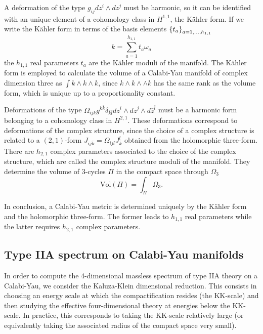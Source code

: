  A deformation of the type $g_{ij}dz^i \wedge dz^j$ must be harmonic, so it can be identified with an unique element of a cohomology class in $H^{1,1}$, the Kähler form.
 If we write the Kähler form in terms of the basis elements $\qty{t_a}_{a=1,\ldots,h_{1,1}}$
\begin{equation}
k=\sum_{a=1}^{h_{1,1}}t_a \omega_a
\end{equation}
the $h_{1,1}$ real parameters $t_a$ are the Kähler moduli of the manifold.
The Kähler form is employed to calculate the volume of a Calabi-Yau manifold of complex dimension three as
$\int k\wedge k\wedge k$, since $k\wedge k\wedge \wedge k$ has the same rank as the
volume form, which is unique up to a proportionality constant.

Deformations of the type $\Omega_{ijk}g^{k\bar k}\delta_{\bar k\bar l}dz^i\wedge dz^j \wedge d\bar z^{\bar l}$ must be a harmonic form belonging to a cohomology class in $H^{2,1}$.
These deformations correspond to deformations of the complex structure, 
since the choice of a complex structure is related to a $(2,1)$-form  $J_{ij\bar k}= \Omega_{ijl}J^l_{\bar k}$ 
obtained from the holomorphic three-form.
There are $h_{2,1}$ complex parameters associated to the choice of the complex structure, which are called the complex structure moduli of the manifold.
They determine the volume of 3-cycles $\Pi$ in the compact space through $\Omega_3$ 
\begin{equation}
  \mathrm{Vol}(\Pi)=\int_\Pi \Omega_3.
\end{equation}

In conclusion, a Calabi-Yau metric is determined uniquely by the Kähler form and the holomorphic three-form.
The former leads to $h_{1,1}$ real parameters while the latter requires $h_{2,1}$ complex parameters.


\subsection{Type IIA spectrum on Calabi-Yau manifolds}
In order to compute the 4-dimensional massless spectrum of type IIA theory on a Calabi-Yau, we consider the 
Kaluza-Klein dimensional reduction.
This consists in choosing an energy scale at which the compactification resides (the KK-scale)
and then studying the effective four-dimensional theory at energies below the KK-scale.
In practice, this corresponds to taking the KK-scale relatively large (or equivalently taking the associated radius of the compact space very small). 

